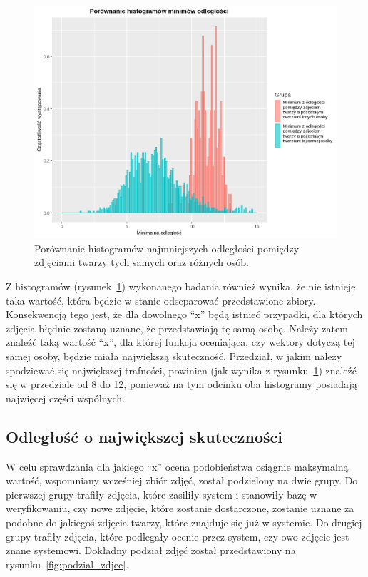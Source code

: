 \begin{figure}[H]
    \centering
    \includegraphics[width=1\textwidth]{images/wykres_najmniejszych_odleglosc_wspolny}
    \caption{
        Porównanie histogramów najmniejszych odległości pomiędzy
        zdjęciami twarzy tych samych oraz różnych osób.
    }
    \customsource
    \label{fig:wykres_najmniejszych_odleglosc_wspolny}
\end{figure}

\pagebreak

Z histogramów (rysunek~\ref{fig:wykres_najmniejszych_odleglosc_wspolny}) wykonanego badania również wynika,
że nie istnieje taka wartość, która będzie w stanie odseparować przedstawione zbiory.
Konsekwencją tego jest, że dla dowolnego ``x'' będą istnieć przypadki, dla których
zdjęcia błędnie zostaną uznane, że przedstawiają tę samą osobę.
Należy zatem znaleźć taką wartość ``x'', dla której funkcja oceniająca, czy wektory
dotyczą tej samej osoby, będzie miała największą skuteczność.
Przedział, w jakim należy spodziewać się największej trafności,
powinien (jak wynika z rysunku~\ref{fig:wykres_najmniejszych_odleglosc_wspolny})
znaleźć się w przedziale od \num{8} do \num{12}, ponieważ na tym odcinku
oba histogramy posiadają najwięcej części wspólnych.

\subsection{Odległość o największej skuteczności}

W celu sprawdzania dla jakiego ``x'' ocena podobieństwa osiągnie maksymalną wartość,
wspomniany wcześniej zbiór zdjęć, został podzielony na dwie grupy.
Do pierwszej grupy trafiły zdjęcia, które zasiliły system i stanowiły bazę
w weryfikowaniu, czy nowe zdjęcie, które zostanie dostarczone,
zostanie uznane za podobne do jakiegoś zdjęcia twarzy, które znajduje się już w systemie.
Do drugiej grupy trafiły zdjęcia, które podlegały ocenie przez system, czy owo zdjęcie jest znane systemowi.
Dokładny podział zdjęć został przedstawiony na rysunku~\ref{fig:podzial_zdjec}.

